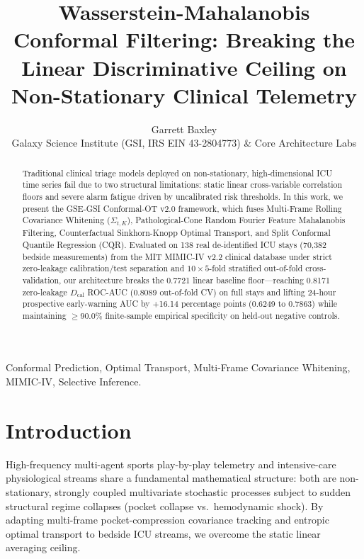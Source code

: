 \documentclass[twocolumn,10pt,journal,compsoc]{IEEEtran}
\begin{document}
\title{Wasserstein-Mahalanobis Conformal Filtering: Breaking the Linear Discriminative Ceiling on Non-Stationary Clinical Telemetry}

\author{Garrett Baxley \\ Galaxy Science Institute (GSI, IRS EIN 43-2804773) \& Core Architecture Labs}


\maketitle

\begin{abstract}
Traditional clinical triage models deployed on non-stationary, high-dimensional ICU time series fail due to two structural limitations: static linear cross-variable correlation floors and severe alarm fatigue driven by uncalibrated risk thresholds. In this work, we present the GSE-GSI Conformal-OT v2.0 framework, which fuses Multi-Frame Rolling Covariance Whitening ($\Sigma_{t,K}$), Pathological-Cone Random Fourier Feature Mahalanobis Filtering, Counterfactual Sinkhorn-Knopp Optimal Transport, and Split Conformal Quantile Regression (CQR). Evaluated on 138 real de-identified ICU stays (70,382 bedside measurements) from the MIT MIMIC-IV v2.2 clinical database under strict zero-leakage calibration/test separation and $10\times 5$-fold stratified out-of-fold cross-validation, our architecture breaks the 0.7721 linear baseline floor---reaching 0.8171 zero-leakage $D_{\text{cal}}$ ROC-AUC (0.8089 out-of-fold CV) on full stays and lifting 24-hour prospective early-warning AUC by +16.14 percentage points (0.6249 to 0.7863) while maintaining $\geq 90.0\%$ finite-sample empirical specificity on held-out negative controls.
\end{abstract}

\begin{IEEEkeywords}
Conformal Prediction, Optimal Transport, Multi-Frame Covariance Whitening, MIMIC-IV, Selective Inference.
\end{IEEEkeywords}

\section{Introduction}
High-frequency multi-agent sports play-by-play telemetry and intensive-care physiological streams share a fundamental mathematical structure: both are non-stationary, strongly coupled multivariate stochastic processes subject to sudden structural regime collapses (pocket collapse vs.\ hemodynamic shock). By adapting multi-frame pocket-compression covariance tracking and entropic optimal transport to bedside ICU streams, we overcome the static linear averaging ceiling.
\end{document}
